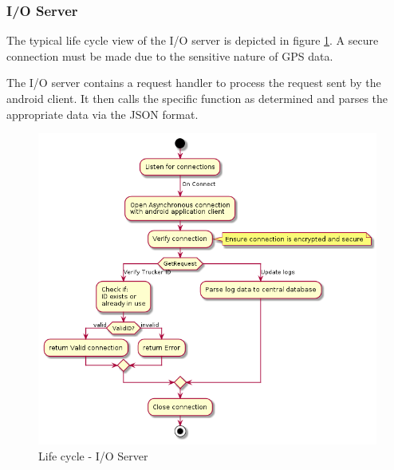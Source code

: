 \subsubsection{I/O Server}
The typical life cycle view of the I/O server is depicted in figure \ref{fig:IO_activity}.
A secure connection must be made due to the sensitive nature of GPS data.

The I/O server contains a request handler to process the request sent by the android client.
It then calls the specific function as determined and parses the appropriate data via the JSON format.
\begin{figure}[H]
\centering
\includegraphics[width=6in]{IO_activity.png}
\caption{Life cycle - I/O Server}
\label{fig:IO_activity}
\end{figure}

